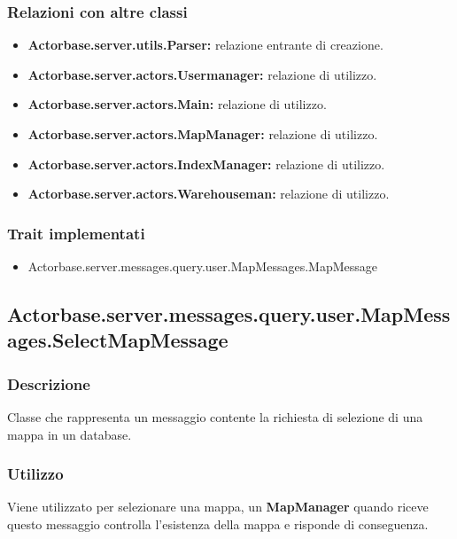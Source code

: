 \documentclass[a4paper]{article}
\begin{document}
			\subsubsection{Relazioni con altre classi}
				\begin{itemize}
					\item \textbf{Actorbase.server.utils.Parser:} relazione entrante di creazione.
					\item \textbf{Actorbase.server.actors.Usermanager:} relazione di utilizzo.
					\item \textbf{Actorbase.server.actors.Main:} relazione di utilizzo.
					\item \textbf{Actorbase.server.actors.MapManager:} relazione di utilizzo.
					\item \textbf{Actorbase.server.actors.IndexManager:} relazione di utilizzo.
					\item \textbf{Actorbase.server.actors.Warehouseman:} relazione di utilizzo.
				\end{itemize}
			\subsubsection{Trait implementati}
				\begin{itemize}
					\item Actorbase.server.messages.query.user.MapMessages.MapMessage
				\end{itemize}
				
		\subsection{Actorbase.server.messages.query.user.MapMessages.SelectMapMessage}
			\subsubsection{Descrizione}
				Classe che rappresenta un messaggio contente la richiesta di selezione di una mappa in un database.
				
			\subsubsection{Utilizzo}
				Viene utilizzato per selezionare una mappa, un \textbf{MapManager} quando riceve questo messaggio controlla l'esistenza della mappa e risponde di conseguenza.
				
\end{document}
